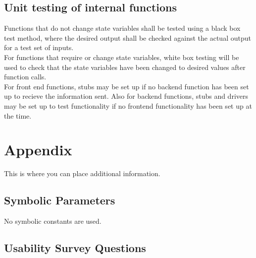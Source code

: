 \documentclass[12pt, titlepage]{article}
\begin{document}

\subsection{Unit testing of internal functions}
Functions that do not change state variables shall be tested using a black box test method, where the desired output shall be checked against the actual output for a test set of inputs. \\
For functions that require or change state variables, white box testing will be used to check that the state variables have been changed to desired values after function calls. \\
For front end functions, stubs may be set up if no backend function has been set up to recieve the information sent. Also for backend functions, stubs and drivers may be set up to test functionality if no frontend functionality has been set up at the time.







\newpage

\section{Appendix}

This is where you can place additional information.

\subsection{Symbolic Parameters}
No symbolic constants are used.
\subsection{Usability Survey Questions}
\end{document}
